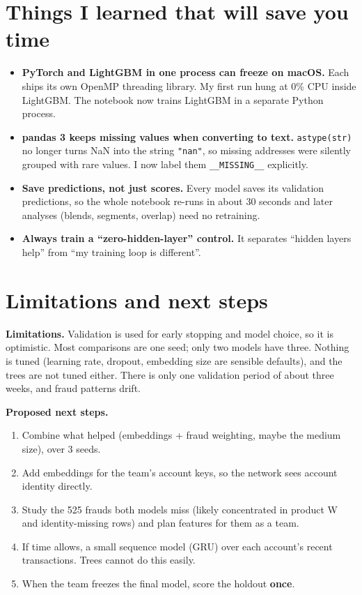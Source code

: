 \documentclass[11pt]{article}
\begin{document}
\section{Things I learned that will save you time}
\begin{itemize}
\item \textbf{PyTorch and LightGBM in one process can freeze on macOS.} Each ships its own OpenMP threading library. My first run hung at 0\% CPU inside LightGBM. The notebook now trains LightGBM in a separate Python process.
\item \textbf{pandas 3 keeps missing values when converting to text.} \texttt{astype(str)} no longer turns NaN into the string \texttt{"nan"}, so missing addresses were silently grouped with rare values. I now label them \texttt{\_\_MISSING\_\_} explicitly.
\item \textbf{Save predictions, not just scores.} Every model saves its validation predictions, so the whole notebook re-runs in about 30 seconds and later analyses (blends, segments, overlap) need no retraining.
\item \textbf{Always train a ``zero-hidden-layer'' control.} It separates ``hidden layers help'' from ``my training loop is different''.
\end{itemize}

\section{Limitations and next steps}
\textbf{Limitations.} Validation is used for early stopping and model choice, so it is optimistic. Most comparisons are one seed; only two models have three. Nothing is tuned (learning rate, dropout, embedding size are sensible defaults), and the trees are not tuned either. There is only one validation period of about three weeks, and fraud patterns drift.

\textbf{Proposed next steps.}
\begin{enumerate}
\item Combine what helped (embeddings + fraud weighting, maybe the medium size), over 3 seeds.
\item Add embeddings for the team's account keys, so the network sees account identity directly.
\item Study the 525 frauds both models miss (likely concentrated in product W and identity-missing rows) and plan features for them as a team.
\item If time allows, a small sequence model (GRU) over each account's recent transactions. Trees cannot do this easily.
\item When the team freezes the final model, score the holdout \textbf{once}.
\end{enumerate}
\end{document}
